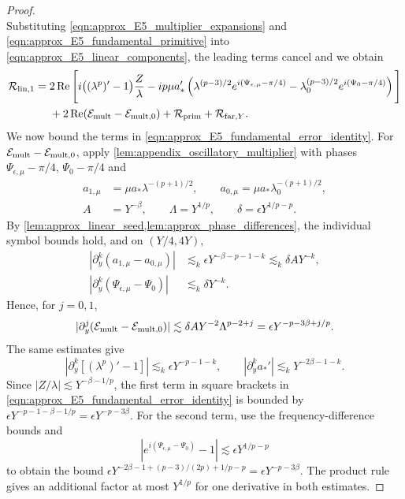 \documentclass[11pt]{amsart}
\theoremstyle{definition}
\theoremstyle{remark}
\numberwithin{equation}{section}
\newcommand{\mc}[1]{\mathcal{#1}}
\begin{document}
\begin{proof}
\begin{equation}
    \end{equation}
    Substituting \eqref{eqn:approx_E5_multiplier_expansions} and \eqref{eqn:approx_E5_fundamental_primitive} into \eqref{eqn:approx_E5_linear_components}, the leading terms cancel and we obtain
    \begin{equation}\label{eqn:approx_E5_fundamental_error_identity}
    \begin{aligned}
        \mc{R}_{\textup{lin},1}
        ={}&2\operatorname{Re}\Bigg[
        i\bigl((\lambda^p)'-1\bigr)\frac{Z}{\lambda} -ip\mu a_*'\left(
        \lambda^{(p-3)/2}e^{i(\Psi_{\epsilon,\mu}-\pi/4)}
        -\lambda_0^{(p-3)/2}e^{i(\Psi_0-\pi/4)}
        \right)\Bigg]\\
        &+2\operatorname{Re}(\mc{E}_{\textup{mult}}-\mc{E}_{\textup{mult},0})+\mc{R}_{\textup{prim}}+\mc{R}_{\textup{far},Y}.
    \end{aligned}
    \end{equation}
    We now bound the terms in \eqref{eqn:approx_E5_fundamental_error_identity}. For $\mc{E}_{\textup{mult}}-\mc{E}_{\textup{mult},0}$, apply \cref{lem:appendix_oscillatory_multiplier} with phases $\Psi_{\epsilon,\mu}-\pi/4$, $\Psi_0-\pi/4$ and
    \[
    \begin{aligned}
        a_{1,\mu}&=\mu a_*\lambda^{-(p+1)/2},\qquad
        a_{0,\mu}=\mu a_*\lambda_0^{-(p+1)/2},\\
        A&=Y^{-\beta},\qquad \Lambda=Y^{1/p},\qquad
        \delta=\epsilon Y^{1/p-p}.
    \end{aligned}
    \]
    By \cref{lem:approx_linear_seed,lem:approx_phase_differences}, the individual symbol bounds hold, and on $(Y/4,4Y)$,
    \[
    \begin{aligned}
        |\partial_y^k(a_{1,\mu}-a_{0,\mu})|&\lesssim_k\epsilon Y^{-\beta-p-1-k}
        \lesssim_k\delta A Y^{-k},\\
        |\partial_y^k(\Psi_{\epsilon,\mu}-\Psi_0)|&\lesssim_k\delta Y^{-k}.
    \end{aligned}
    \]
    Hence, for $j=0,1$,
    \begin{equation}\label{eqn:approx_E5_multiplier_difference_bound}
        |\partial_y^j(\mc{E}_{\textup{mult}}-\mc{E}_{\textup{mult},0})|
        \lesssim\delta A Y^{-2}\Lambda^{p-2+j}
        =\epsilon Y^{-p-3\beta+j/p}.
    \end{equation}
    The same estimates give
    \[
        |\partial_y^k[(\lambda^p)'-1]|\lesssim_k\epsilon Y^{-p-1-k},
        \qquad |\partial_y^k a_*'|\lesssim_kY^{-2\beta-1-k}.
    \]
    Since $|Z/\lambda|\lesssim Y^{-\beta-1/p}$, the first term in square brackets in \eqref{eqn:approx_E5_fundamental_error_identity} is bounded by $\epsilon Y^{-p-1-\beta-1/p}=\epsilon Y^{-p-3\beta}$. For the second term, use the frequency-difference bounds and
    \[|e^{i(\Psi_{\epsilon,\mu}-\Psi_0)}-1|\lesssim\epsilon Y^{1/p-p}\]
    to obtain the bound $\epsilon Y^{-2\beta-1+(p-3)/(2p)+1/p-p}=\epsilon Y^{-p-3\beta}$. The product rule gives an additional factor at most $Y^{1/p}$ for one derivative in both estimates.


\end{proof}
\end{document}
